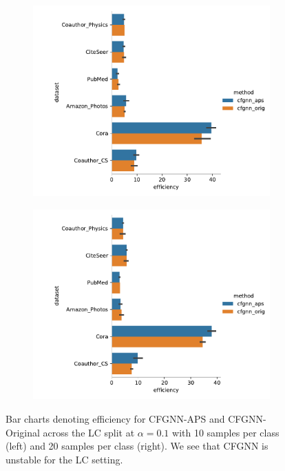 \begin{figure}
    \centering
    \begin{subfigure}{0.48\linewidth}
        \includegraphics[width=\linewidth]{graphConformal/figures/nspc/cfgnn_aps_vs_orig_efficiency_10}
    \end{subfigure}
    \begin{subfigure}{0.48\linewidth}
        \includegraphics[width=\linewidth]{graphConformal/figures/nspc/cfgnn_aps_vs_orig_efficiency_20}
    \end{subfigure}
    \caption{Bar charts denoting efficiency for CFGNN-APS and CFGNN-Original across the LC split at $\alpha=0.1$ with 10 samples per  class (left) and 20 samples per class (right). We see that CFGNN is unstable for the LC setting.}
\end{figure}

